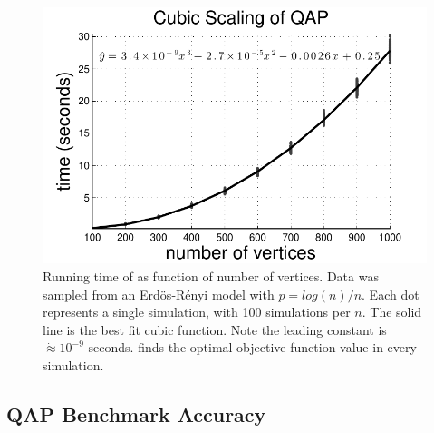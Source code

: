 \documentclass[11pt]{article}
\begin{document}
\begin{figure}[htbp]
	\centering			
	\includegraphics[width=0.5\linewidth]{../figs/ErdosRenyi_results.pdf}
	\caption{Running time of \FAQ as function of number of vertices. Data was sampled from an Erd\"os-R\'enyi model with $p=log(n)/n$.  Each dot represents a single simulation, with 100 simulations per $n$.  The solid line is the best fit cubic function.  Note the leading constant is $\dot{\approx} 10^{-9}$ seconds. \FAQ finds the optimal objective function value in every simulation.}
	\label{fig:scaling}
\end{figure}


\subsection{QAP Benchmark Accuracy} %
\label{sub:qap_benchmarks}
\end{document}
